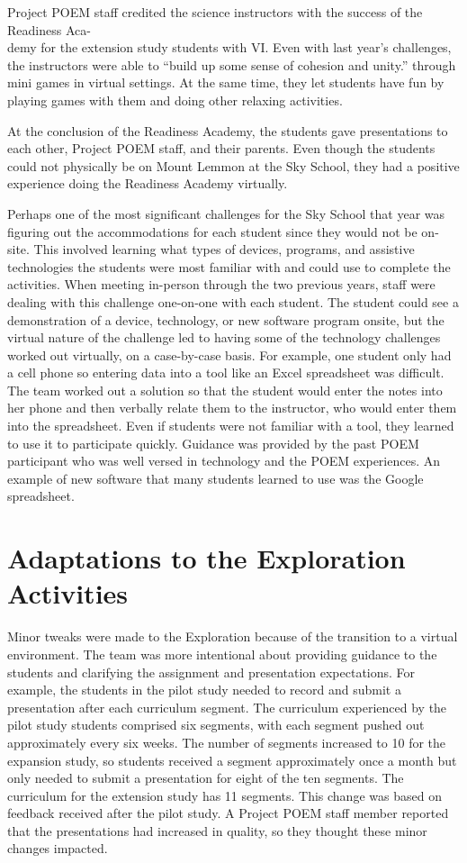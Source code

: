 \documentclass[11pt]{sig-alternate}
\begin{document}
\begin{large}
{Project POEM staff credited the science instructors with the success of the Readiness Aca-\\demy for the extension study students with VI. Even with last year’s challenges, the instructors were able to “build up some sense of cohesion and unity.” through mini games in virtual settings. At the same time, they let students have fun by playing games with them and doing other relaxing activities. 

At the conclusion of the Readiness Academy, the students gave presentations to each other, Project POEM staff, and their parents. Even though the students could not physically be on Mount Lemmon at the Sky School, they had a positive experience doing the Readiness Academy virtually. 

Perhaps one of the most significant challenges for the Sky School that year was figuring out the accommodations for each student since they would not be on-site. This involved learning what types of devices, programs, and assistive technologies the students were most familiar with and could use to complete the activities. When meeting in-person through the two previous years, staff were dealing with this challenge one-on-one with each student. The student could see a demonstration of a device, technology, or new software program onsite, but the virtual nature of the challenge led to having some of the technology challenges worked out virtually, on a case-by-case basis. For example, one student only had a cell phone so entering data into a tool like an Excel spreadsheet was difficult. The team worked out a solution so that the student would enter the notes into her phone and then verbally relate them to the instructor, who would enter them into the spreadsheet. Even if students were not familiar with a tool, they learned to use it to participate quickly. Guidance was provided by the past POEM participant who was well versed in technology and the POEM experiences. An example of new software that many students learned to use was the Google spreadsheet. 

\section*{Adaptations to the Exploration Activities}
Minor tweaks were made to the Exploration because of the transition to a virtual environment. The team was more intentional about providing guidance to the students and clarifying the assignment and presentation expectations. For example, the students in the pilot study needed to record and submit a presentation after each curriculum segment. The curriculum experienced by the pilot study students comprised six segments, with each segment pushed out approximately every six weeks. The number of segments increased to 10 for the expansion study, so students received a segment approximately once a month but only needed to submit a presentation for eight of the ten segments. The curriculum for the extension study has 11 segments. This change was based on feedback received after the pilot study. A Project POEM staff member reported that the presentations had increased in quality, so they thought these minor changes impacted.

}
\end{large}
\end{document}
